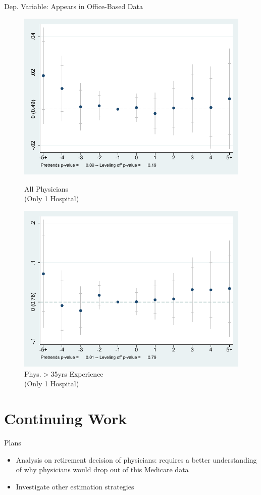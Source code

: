 \documentclass[10pt]{beamer}
\begin{document}
\begin{frame}{Dep. Variable: Appears in Office-Based Data}
\begin{figure}[ht]
        \begin{minipage}[b]{0.47\linewidth}
            \centering
            \includegraphics[width=\textwidth]{Objects/xtevent_hosp_fullsample_office.pdf}
            \caption{\small All Physicians \\(Only 1 Hospital)}
        \end{minipage}
        \hspace{0.2cm}
        \begin{minipage}[b]{0.47\linewidth}
            \centering
            \includegraphics[width=\textwidth]{Objects/xtevent_hosp_oldsample_office.pdf}
            \caption{\small Phys.$>$35yrs Experience\\ (Only 1 Hospital)}
        \end{minipage}
    \end{figure}
\end{frame}


\section{Continuing Work}

\begin{frame}{Plans}
    \begin{itemize}
        \item Analysis on retirement decision of physicians: requires a better understanding of why physicians would drop out of this Medicare data
        \item Investigate other estimation strategies
    \end{itemize}
\end{frame}
\end{document}
